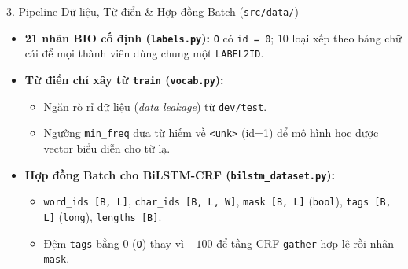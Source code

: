 \documentclass[aspectratio=169,10pt]{beamer}
\begin{document}
\begin{frame}{3. Pipeline Dữ liệu, Từ điển \& Hợp đồng Batch (\texttt{src/data/})}
  \begin{itemize}
    \item \textbf{21 nhãn BIO cố định (\texttt{labels.py}):} \texttt{O} có \texttt{id = 0}; $10$ loại xếp theo bảng chữ cái để mọi thành viên dùng chung một \texttt{LABEL2ID}.
    \item \textbf{Từ điển chỉ xây từ \texttt{train} (\texttt{vocab.py}):}
      \begin{itemize}
        \item Ngăn rò rỉ dữ liệu (\textit{data leakage}) từ \texttt{dev/test}.
        \item Ngưỡng \texttt{min\_freq} đưa từ hiếm về \texttt{<unk>} (id=1) để mô hình học được vector biểu diễn cho từ lạ.
      \end{itemize}
    \item \textbf{Hợp đồng Batch cho BiLSTM-CRF (\texttt{bilstm\_dataset.py}):}
      \begin{itemize}
        \item \texttt{word\_ids [B, L]}, \texttt{char\_ids [B, L, W]}, \texttt{mask [B, L]} (\texttt{bool}), \texttt{tags [B, L]} (\texttt{long}), \texttt{lengths [B]}.
        \item Đệm \texttt{tags} bằng $0$ (\texttt{O}) thay vì $-100$ để tầng CRF \texttt{gather} hợp lệ rồi nhân \texttt{mask}.
      \end{itemize}
  \end{itemize}
\end{frame}
\end{document}
